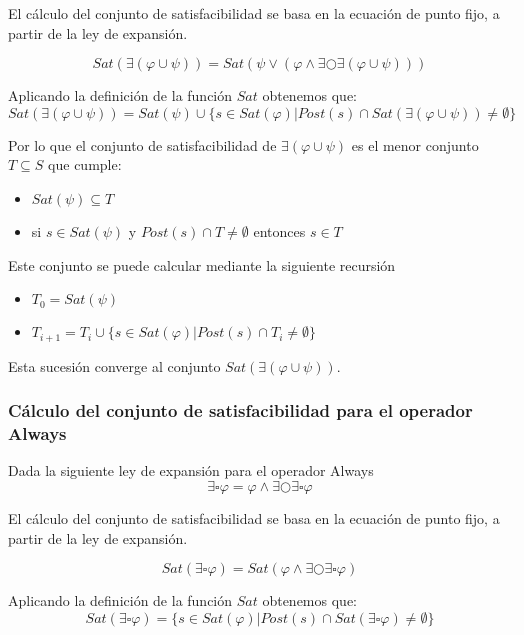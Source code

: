 El cálculo del conjunto de satisfacibilidad se basa en la ecuación de punto fijo, a partir de 
 la ley de expansión.

\[
Sat(\exists (\varphi \cup \psi)) = Sat(\psi \lor (\varphi \land \exists \bigcirc \exists (\varphi \cup \psi)))
\]

Aplicando la definición de la función $Sat$ obtenemos que:
\[
Sat(\exists (\varphi \cup \psi)) = Sat(\psi) \cup \{ s \in Sat(\varphi) | Post(s) \cap Sat(\exists (\varphi \cup \psi)) \neq \emptyset \}
\]

Por lo que el conjunto de satisfacibilidad de $\exists (\varphi \cup \psi)$ es el
 menor conjunto $T \subseteq S$ que cumple:

\begin{itemize}
\item $Sat(\psi) \subseteq T$
\item si $s \in Sat(\psi)$ y $Post(s) \cap T \neq \emptyset$ entonces $s \in T$

\end{itemize}

Este conjunto se puede calcular mediante la siguiente recursión
\begin{itemize}
\item $T_0 = Sat(\psi)$
\item $T_{i+1} = T_i \cup \{ s \in Sat(\varphi) | Post(s) \cap T_i \neq \emptyset \} $

\end{itemize}

Esta sucesión converge al conjunto $Sat(\exists (\varphi \cup \psi))$.


\subsubsection{Cálculo del conjunto de satisfacibilidad para el operador Always}
Dada la siguiente ley de expansión para el operador Always
\[
\exists \square \varphi = \varphi \land \exists \bigcirc \exists \square \varphi
\]

El cálculo del conjunto de satisfacibilidad se basa en la ecuación de punto fijo, a partir de 
 la ley de expansión.

\[
Sat(\exists \square \varphi) = Sat(\varphi \land \exists \bigcirc \exists \square \varphi)
\]

Aplicando la definición de la función $Sat$ obtenemos que:
\[
Sat(\exists \square \varphi) = \{ s \in Sat(\varphi) | Post(s) \cap Sat(\exists \square \varphi) \neq \emptyset \}
\]

